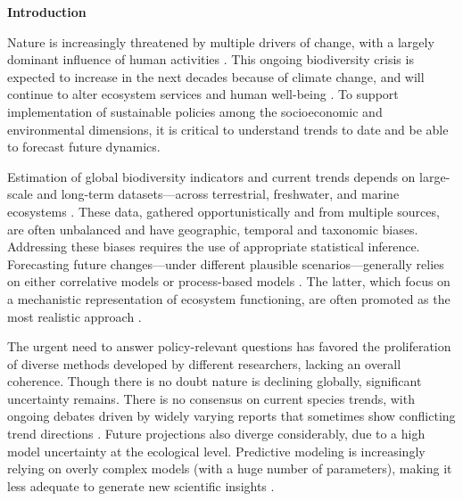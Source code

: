 \documentclass[11pt]{article}
\begin{document}
\noindent \textbf{Introduction}

Nature is increasingly threatened by multiple drivers of change, with a largely dominant influence of human activities \citep{Diaz2019}. This ongoing biodiversity crisis is expected to increase in the next decades because of climate change, and will continue to alter ecosystem services and human well-being \citep{IPBES2019}. To support implementation of sustainable policies among the socioeconomic and environmental dimensions, it is critical to understand trends to date and be able to forecast future dynamics. 

Estimation of global biodiversity indicators and current trends depends on large-scale and long-term datasets---across terrestrial, freshwater, and marine ecosystems \citep[e.g.][]{Dornelas2018}. These data, gathered opportunistically and from multiple sources, are often unbalanced and have geographic, temporal and taxonomic biases. Addressing these biases requires the use of appropriate statistical inference.
Forecasting future changes---under different plausible scenarios---generally relies on either correlative models or process-based models \citep{IPBES2019}. The latter, which focus on a mechanistic representation of ecosystem functioning, are often promoted as the most realistic approach \citep{Urban2016, Pilowsky2022}. %

The urgent need to answer policy-relevant questions has favored the proliferation of diverse methods developed by different researchers, lacking an overall coherence. Though there is no doubt nature is declining globally, significant uncertainty remains. There is no consensus on current species trends, with ongoing debates driven by widely varying reports that sometimes show conflicting trend directions \citep{Dornelas2014, Leung2020, Buschke2021, Johnson2024}. Future projections also diverge considerably, due to a high model uncertainty at the ecological level. Predictive modeling is increasingly relying on overly complex models (with a huge number of parameters), making it less adequate to generate new scientific insights \citep{Franklin2020}.
\end{document}
